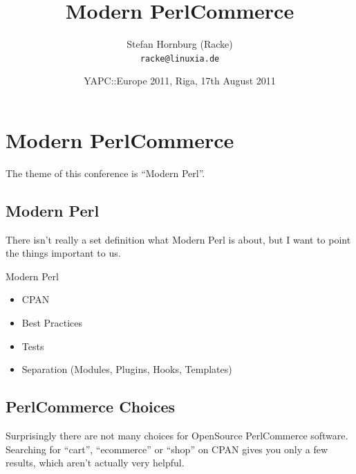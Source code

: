 
\usepackage[T1]{fontenc}
\usepackage{mathptmx}
\usepackage[scaled=.90]{helvet}
\usepackage{courier}

\usepackage{beamerthemesplit}
\usepackage{verbatim}
\usepackage{hyperref}
\usepackage{listings}
\lstset{language=Perl,basicstyle=\footnotesize,tabsize=3,showstringspaces=false}

\title{Modern PerlCommerce}
\author[racke]{Stefan Hornburg (Racke)\\ \texttt{racke@linuxia.de}}
\date[]{YAPC::Europe 2011, Riga, 17th August 2011}


\maketitle{}

\begin{frame}
  \titlepage
\end{frame}

\tableofcontents

\section{Modern PerlCommerce}
The theme of this conference is ``Modern Perl''.

\subsection{Modern Perl}
There isn't really a set definition what Modern Perl is about,
but I want to point the things important to us.

\begin{frame}{Modern Perl}
\begin{itemize}
\item CPAN
\item Best Practices
\item Tests
\item Separation (Modules, Plugins, Hooks, Templates)
\end{itemize}
\end{frame}

\subsection{PerlCommerce Choices}
Surprisingly there are not many choices for OpenSource PerlCommerce
software. Searching for ``cart'', ``ecommerce'' or ``shop'' on CPAN
gives you only a few results, which aren't actually very helpful.

